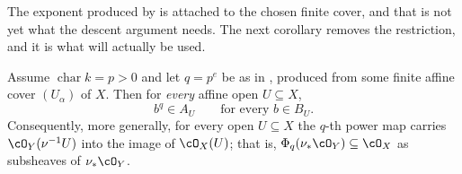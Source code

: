 The exponent produced by  is attached to the
chosen finite cover, and that is not yet what the descent argument needs.
The next corollary removes the restriction, and it is what will actually be
used.

\begin{corollary}
\label{cor:ch43-frobenius-all-affines}
Assume $\operatorname{char}k=p>0$ and let $q=p^e$ be as in
, produced from some finite affine cover
$(U_\alpha)$ of $X$.  Then for \emph{every} affine open
$U\subseteq X$,
\[
 b^q\in A_U
 \qquad\text{for every }b\in B_U .
\]
Consequently, more generally, for every open $U\subseteq X$ the $q$-th
power map carries $\cO_Y(\nu^{-1}U)$ into the image of
$\cO_X(U)$; that is, $\Phi_q(\nu_*\cO_Y)\subseteq\cO_X$ as subsheaves of
$\nu_*\cO_Y$.
\end{corollary}

